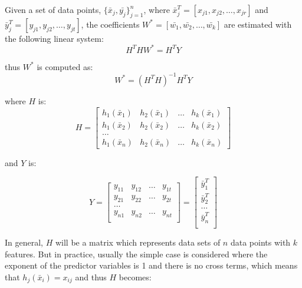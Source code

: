 Given a set of data points, $\{\bar{x}_j,\bar{y_j}\}_{j=1}^n$, where $\bar{x}_j^T=[x_{j1},x_{j2}, \dots, x_{jr}]$ and $\bar{y}_j^T=[y_{j1},y_{j2}, \dots, y_{jt}]$, the coefficients $W^* = [\bar{w_1},\bar{w_2},\dots,\bar{w_k}]$ are estimated with the following linear system:
\begin{equation}\label{eq: regression_solve}
    H^THW^*=H^TY
\end{equation}

thus $W^*$ is computed as:
\begin{equation}\label{eq: regression_solve_final}
    W^*=(H^TH)^{-1}H^TY
\end{equation}



where $H$ is:
\begin{equation}
    H=\begin{bmatrix}
h_1(\bar{x}_1) & h_2(\bar{x}_1) &\dots &h_k(\bar{x}_1)\\
h_1(\bar{x}_2) & h_2(\bar{x}_2) &\dots &h_k(\bar{x}_2)\\
\dots\\
h_1(\bar{x}_n) & h_2(\bar{x}_n) &\dots &h_k(\bar{x}_n)
\end{bmatrix}
\end{equation}

and $Y$ is:

\begin{equation}
    Y=\begin{bmatrix}
y_{11} & y_{12} &\dots &y_{1t}\\
y_{21} & y_{22} &\dots &y_{2t}\\
\dots\\
y_{n1} & y_{n2} &\dots &y_{nt}\\
\end{bmatrix}
=\begin{bmatrix}
\bar{y}_1^T\\
\bar{y}_2^T\\
\dots\\
\bar{y}_n^T\\
\end{bmatrix}
\end{equation}

In general, $H$ will be a matrix which represents data sets of $n$ data points with $k$ features. But in practice, usually the simple case is considered where the exponent of the predictor variables is 1 and there is no cross terms, which means that $h_j(\bar{x}_i) = x_{ij}$ and thus $H$ becomes:

